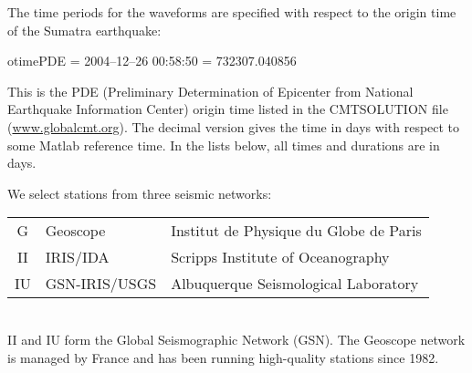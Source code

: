 \documentclass[11pt,titlepage,fleqn]{article}
\begin{document}
\medskip\noindent
The time periods for the waveforms are specified with respect to the origin time of the Sumatra earthquake:

\vspace{0.5cm}
otimePDE = 2004--12--26 00:58:50 = 732307.040856
\vspace{0.5cm}

\noindent
This is the PDE (Preliminary Determination of Epicenter from National Earthquake Information Center) origin time listed in the CMTSOLUTION file (\url{www.globalcmt.org}). The decimal version gives the time in days with respect to some Matlab reference time. In the lists below, all times and durations are in days.

\medskip\noindent
We select stations from three seismic networks: \\

\begin{tabular}{cll}
\hline
G   & Geoscope      & Institut de Physique du Globe de Paris \\
II  & IRIS/IDA      & Scripps Institute of Oceanography \\
IU  & GSN-IRIS/USGS & Albuquerque Seismological Laboratory \\
\hline
\end{tabular} \\

\noindent
II and IU form the Global Seismographic Network (GSN).
The Geoscope network is managed by France and has been running high-quality stations since 1982.
\end{document}
